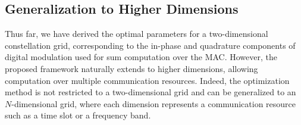 \documentclass[journal,12pt,onecolumn,draftclsnofoot]{IEEEtran}
\theoremstyle{definition}
\begin{document}
\subsection{Generalization to Higher Dimensions}\label{sec:higherN}

Thus far, we have derived the optimal parameters for a two-dimensional constellation grid, corresponding to the in-phase and quadrature components of digital modulation used for sum computation over the MAC.  However, the proposed framework naturally extends to higher dimensions, allowing computation over multiple communication resources. 
Indeed, the optimization method is not restricted to a two-dimensional grid and can be generalized to an $N$-dimensional grid, where each dimension represents a communication resource such as a time slot or a frequency band.
\end{document}
